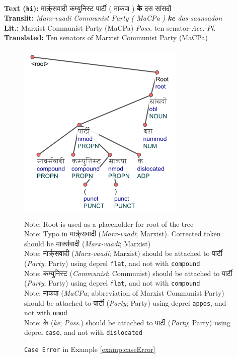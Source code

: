 \begin{example}
\label{examp:caseError}
\textbf{ }\\
\textbf{Text (\texttt{hi}):} \texthindi{मार्क्र्सवादी कम्युनिस्ट पार्टी ( माकपा ) \textbf{के} दस सांसदों}\\
\textbf{Translit:} \textit{Marx-vaadi Communist Party ( MaCPa ) \textbf{ke} das saansadon}\\
\textbf{Lit.:} Marxist Communist Party (MaCPa) \textit{Poss.} ten senator-\textit{Acc.}-\textit{Pl.}\\
\textbf{Translated:} Ten senators of Marxist Communist Party (MaCPa)
\end{example}

\begin{figure}[H]
    \centering
    \includegraphics[scale=0.90]{img/caseError.png}
    \caption{\texttt{Case Error} in Example \ref{examp:caseError}}
    Note: Root is used as a placeholder for root of the tree\\
    Note: Typo in \texthindi{मार्क्र्सवादी} (\textit{Marx-vaadi}; Marxist). Corrected token should be \texthindi{मार्क्सवादी} (\textit{Marx-vaadi}; Marxist)\\
    Note: \texthindi{मार्क्र्सवादी} (\textit{Marx-vaadi}; Marxist) should be attached to \texthindi{पार्टी} (\textit{Party}; Party) using deprel \texttt{flat}, and not with \texttt{compound}\\
    Note: \texthindi{कम्युनिस्ट} (\textit{Communist}; Communist) should be attached to 
    \texthindi{पार्टी} (\textit{Party}; Party) using deprel \texttt{flat}, and not with \texttt{compound}\\
    Note: \texthindi{माकपा} (\textit{MaCPa}; abbreviation of Marxist Communist Party) should be attached to 
    \texthindi{पार्टी} (\textit{Party}; Party) using deprel \texttt{appos}, and not with \texttt{nmod}\\
    Note: \texthindi{के} (\textit{ke}; \textit{Poss.}) should be attached to 
    \texthindi{पार्टी} (\textit{Party}; Party) using deprel \texttt{case}, and not with \texttt{dislocated}
    
    \label{examp:caseError-fig}
\end{figure}

